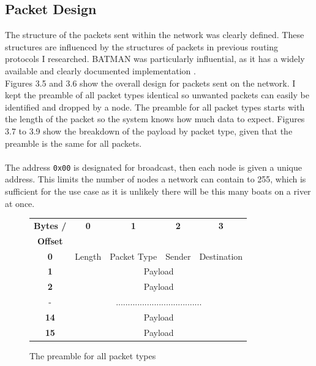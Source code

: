 \documentclass[12pt,a4paper]{report}
\begin{document}
\FloatBarrier

\subsection{Packet Design}
The structure of the packets sent within the network was clearly defined. These structures are influenced by the structures of packets in previous routing protocols I researched. BATMAN was particularly influential, as it has a widely available and clearly documented implementation \cite{batman}. \\
Figures 3.5 and 3.6 show the overall design for packets sent on the network. I kept the preamble of all packet types identical so unwanted packets can easily be identified and dropped by a node. The preamble for all packet types starts with the length of the packet so the system knows how much data to expect. Figures 3.7 to 3.9 show the breakdown of the payload by packet type, given that the preamble is the same for all packets.  \\ \\
The address \verb'0x00' is designated for broadcast, then each node is given a unique address. This limits the number of nodes a network can contain to 255, which is sufficient for the use case as it is unlikely there will be this many boats on a river at once. 
\begin{figure}[h]
\begin{center}
\begin{tabular}{ |c|c|c|c|c| } 
\hline
\textbf{Bytes /} & \textbf{0} & \textbf{1} & \textbf{2} & \textbf{3} \\ 
\textbf{Offset} &  &  &  &  \\ 
\hline
\textbf{0} & Length & Packet Type & Sender & Destination \\ 
\hline
\textbf{1} &     \multicolumn{4}{c|}{Payload}  \\ 
\hline
\textbf{2} &     \multicolumn{4}{c|}{Payload}  \\
\hline
 - & \multicolumn{4}{c|}{....................................}  \\
\hline
\textbf{14} & \multicolumn{4}{c|}{Payload}  \\
\hline
\textbf{15} & \multicolumn{4}{c|}{Payload}  \\
\hline
\end{tabular}
\end{center}
\caption{The preamble for all packet types}
\end{figure}
\end{document}
